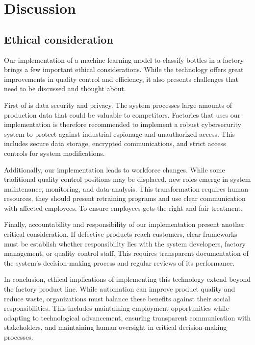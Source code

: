 \section{Discussion}

\subsection{Ethical consideration}

Our implementation of a machine learning model to classify bottles in a factory brings a few important ethical considerations. 
While the technology offers great improvements in quality control and efficiency, it also presents challenges that need to be discussed and thought about.

First of is data security and privacy. 
The system processes large amounts of production data that could be valuable to competitors. 
Factories that uses our implementation is therefore recommended to implement a robust cybersecurity system to protect against industrial espionage and unauthorized access. 
This includes secure data storage, encrypted communications, and strict access controls for system modifications.

Additionally, our implementation leads to workforce changes. While some traditional quality control positions may be displaced, new roles emerge in system maintenance, monitoring, and data analysis. 
This transformation requires human resources, they should present retraining programs and use clear communication with affected employees.
To ensure employees gets the right and fair treatment.

Finally, accountability and responsibility of our implementation present another critical consideration. 
If defective products reach customers, clear frameworks must be establish whether responsibility lies with the system developers, factory management, or quality control staff. 
This requires transparent documentation of the system's decision-making process and regular reviews of its performance.

In conclusion, ethical implications of implementing this technology extend beyond the factory product line.
While automation can improve product quality and reduce waste, organizations must balance these benefits against their social responsibilities. 
This includes maintaining employment opportunities while adapting to technological advancement, ensuring transparent communication with stakeholders, and maintaining human oversight in critical decision-making processes.

